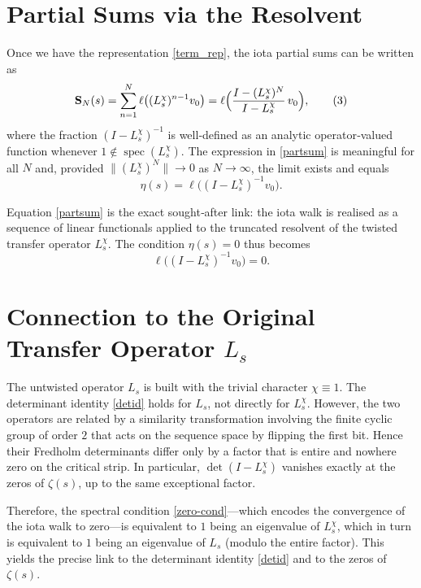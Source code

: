 \documentclass[11pt,a4paper]{article}
\newcommand{\spec}{\operatorname{spec}}
\begin{document}
\section{Partial Sums via the Resolvent}
Once we have the representation \eqref{term_rep}, the iota partial sums can be written as
\[
\mathbf{S}_N(s) = \sum_{n=1}^{N} \ell\bigl( (L_s^{\chi})^{n-1} v_0 \bigr)
= \ell\Bigl( \frac{I - (L_s^{\chi})^{N}}{I - L_s^{\chi}} \, v_0 \Bigr),
\tag{3}
\]
where the fraction $(I - L_s^{\chi})^{-1}$ is well‑defined as an analytic operator‑valued function whenever $1\notin\spec(L_s^{\chi})$.  The expression in \eqref{partsum} is meaningful for all $N$ and, provided $\|(L_s^{\chi})^{N}\|\to 0$ as $N\to\infty$, the limit exists and equals
\[
\eta(s) = \ell\bigl( (I - L_s^{\chi})^{-1} v_0 \bigr).
\tag{4}
\]

Equation \eqref{partsum} is the exact sought‑after link: the iota walk is realised as a sequence of linear functionals applied to the truncated resolvent of the twisted transfer operator $L_s^{\chi}$.  The condition $\eta(s)=0$ thus becomes
\[
\ell\bigl( (I - L_s^{\chi})^{-1} v_0 \bigr) = 0.
\tag{5}
\]

\section{Connection to the Original Transfer Operator $L_s$}
The untwisted operator $L_s$ is built with the trivial character $\chi\equiv 1$.  The determinant identity \eqref{detid} holds for $L_s$, not directly for $L_s^{\chi}$.  However, the two operators are related by a similarity transformation involving the finite cyclic group of order $2$ that acts on the sequence space by flipping the first bit.  Hence their Fredholm determinants differ only by a factor that is entire and nowhere zero on the critical strip.  In particular, $\det(I - L_s^{\chi})$ vanishes exactly at the zeros of $\zeta(s)$, up to the same exceptional factor.

Therefore, the spectral condition \eqref{zero-cond}—which encodes the convergence of the iota walk to zero—is equivalent to $1$ being an eigenvalue of $L_s^{\chi}$, which in turn is equivalent to $1$ being an eigenvalue of $L_s$ (modulo the entire factor).  This yields the precise link to the determinant identity \eqref{detid} and to the zeros of $\zeta(s)$.
\end{document}
